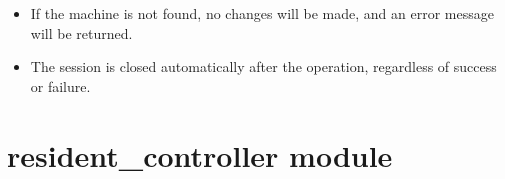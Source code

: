 \documentclass[letterpaper,10pt,english]{sphinxmanual}
\begin{document}
\begin{fulllineitems}
\begin{fulllineitems}
\begin{itemize}
\item {} 
\sphinxAtStartPar
If the machine is not found, no changes will be made, and an error message will be returned.

\item {} 
\sphinxAtStartPar
The session is closed automatically after the operation, regardless of success or failure.

\end{itemize}

\end{fulllineitems}


\end{fulllineitems}



\section{resident\_controller module}
\label{\detokenize{app.controllers:module-app.controllers.resident_controller}}\label{\detokenize{app.controllers:resident-controller-module}}
\end{document}
